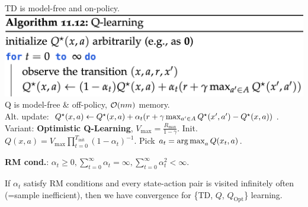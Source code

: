 TD is model-free and on-policy.
\includegraphics[width=0.95\linewidth, trim={0 0 1cm 0}]{images/Q_learning.png}
Q is model-free \& off-policy, $\BigO{nm}$ memory. \\
Alt. update: $\Q*{x}{a} \gets \Q*{x}{a} + \alpha_t\parentheses*{r + \gamma \max_{a' \in \sA} \Q*{x'}{a'} - \Q*{x}{a}}$. \\
Variant: \textbf{Optimistic Q-Learning}, $V_{\max} = \frac{R_{\max}}{1-\gamma}$. Init. $Q(x, a) = V_{\max} \prod_{t=0}^{T_{\text{init}}} (1-\alpha_t)^{-1}$. Pick $a_t = \operatorname*{arg\,max}_a Q(x_t, a)$.
\begin{framed}
    \textbf{RM cond.}: $\alpha_t \geq 0, \sum_{t=0}^{\infty}{\alpha_t} = \infty, \sum_{t=0}^{\infty}{\alpha_t^2} < \infty$. \\
\end{framed}
If $\alpha_t$ satisfy RM conditions and every state-action pair is visited infinitely often (=sample inefficient), then we have convergence for \{TD, $Q$, $Q_{\text{Opt}}$\} learning.
